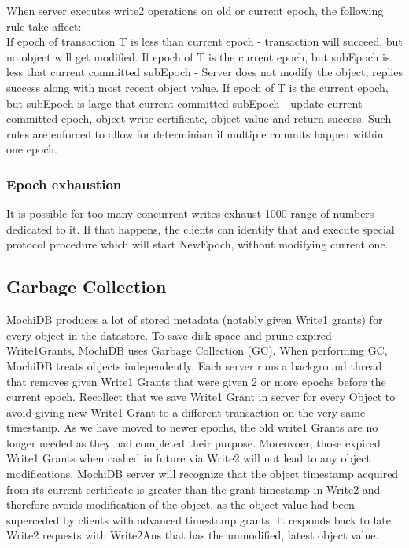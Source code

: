 \documentclass[letterpaper,twocolumn,10pt]{article}
\begin{document}
When server executes write2 operations on old or current epoch, the following rule take affect:\\ If epoch of transaction T is less than current epoch - transaction will succeed, but no object will get modified. If epoch of T is the current epoch, but subEpoch is less that current committed subEpoch - Server does not modify the object, replies success along with most recent object value. If epoch of T is the current epoch, but subEpoch is large that current committed subEpoch - update current committed epoch, object write certificate, object value and return success. Such rules are enforced to allow for determinism if multiple commits happen within one epoch.

\subsubsection{Epoch exhaustion}
It is possible for too many concurrent writes exhaust 1000 range of numbers dedicated to it. If that happens, the clients can identify that and execute special protocol procedure which will start NewEpoch, without modifying current one.

\subsection{Garbage Collection}
MochiDB produces a lot of stored metadata (notably given Write1 grants) for every object in the datastore. To save disk space and prune expired Write1Grants, MochiDB uses Garbage Collection (GC). When performing GC, MochiDB treats objects independently. Each server runs a background thread that removes given Write1 Grants that were given 2 or more epochs before the current epoch. Recollect that we save Write1 Grant in server for every Object to avoid giving new Write1 Grant to a different transaction on the very same timestamp. As we have moved to newer epochs, the old write1 Grants are no longer needed as they had completed their purpose. Moreovoer, those expired Write1 Grants when cashed in future via Write2 will not lead to any object modifications. MochiDB server will recognize that the object timestamp acquired from its current certificate is greater than the grant timestamp in Write2 and therefore avoids modification of the object, as the object value had been superceded by clients with advanced timestamp grants. It responds back to late Write2 requests with Write2Ans that has the unmodified, latest object value.
\end{document}
